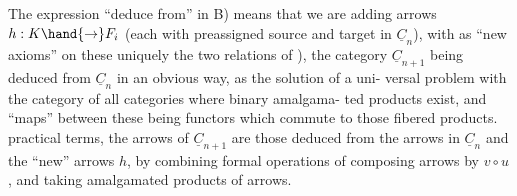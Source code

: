 
The expression ``deduce from'' in B)  means that we are adding arrows
$h: K \hand{\to} F_i$ (each with preassigned source and target in $\underline{C}_n$),  with as
``new axioms'' on  these uniquely the two relations  of ), the category
$\underline{C}_{n+1}$  being deduced from $\underline{C}_n$ in an obvious way,  as the solution of a uni-%
versal problem with the category of all categories where binary amalgama-%
ted products exist,  and ``maps'' between these being functors which commute
to those fibered products.  practical terms,  the arrows of $\underline{C}_{n+1}$ are
those deduced from the arrows in $\underline{C}_n$ and the ``new'' arrows $h$,  by combining
formal operations of composing arrows by $v\circ u$ ,  and taking  amalgamated
products of arrows. 


